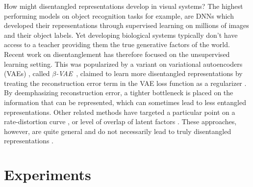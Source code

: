 \documentclass[10pt,letterpaper]{article}
\newcommand{\bvae}{$\beta$-VAE~}
\begin{document}

How might disentangled representations develop in visual systems? The highest performing models on object recognition tasks for example, are DNNs which developed their representations through supervised learning on millions of images and their object labels. Yet developing biological systems typically don't have access to a teacher providing them the true generative factors of the world. Recent work on disentanglement has therefore focused on the unsupervised learning setting. %
This was popularized by a variant on variational autoencoders (VAEs) \cite{Kingma2014}, called \textit{\bvae}, claimed to learn more disentangled representations by treating the reconstruction error term in the VAE loss function as a regularizer \cite{Higgins2017}. By deemphasizing reconstruction error, a tighter bottleneck is placed on the information that can be represented, which can sometimes lead to less entangled representations. Other related methods have targeted a particular point on a rate-distortion curve \cite{Alemi2017}, or level of overlap of latent factors \cite{Mathieu2018}. These approaches, however, are quite general and do not necessarily lead to truly disentangled representations \cite{Alemi2017,Mathieu2018}.


\section{Experiments}
\end{document}
